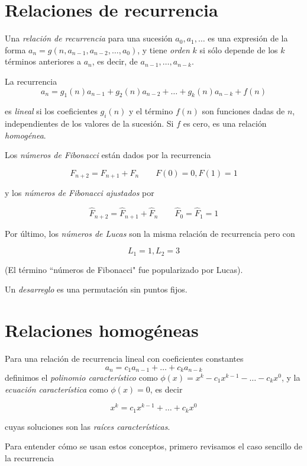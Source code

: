 \section{Relaciones de recurrencia}
\label{section-relaciones-de-recurrencia}
\begin{definition}
\label{definition-combi-002}
Una \emph{relación de recurrencia} para una
sucesión $a_0,a_1, \ldots$ es una expresión
de la forma $a_n = g(n,a_{n-1},a_{n-2},
\ldots,a_0)$, y tiene \emph{orden} $k$ si
sólo depende de los $k$ términos anteriores a
$a_n$, es decir, de $a_{n-1},
\ldots,a_{n-k}$.

La recurrencia
$$
a_n = g_{1}(n)a_{n-1} + g_{2}(n)a_{n-2} +
\ldots + g_k(n)a_{n-k} + f(n)
$$

es \emph{lineal} si los coeficientes $g_i(n)$
y el término $f(n)$ son funciones dadas de
$n$, independientes de los valores de la
sucesión. Si $f$ es cero, es una relación
\emph{homogénea}.
\end{definition}
\begin{definition}
\label{definition-combi-003}
Los \emph{números de Fibonacci} están dados
por la recurrencia

$$
F_{n+2}=F_{n+1}+F_n\qquad F(0)=0,F(1)=1
$$

y los \emph{números de Fibonacci ajustados}
por

$$
\hat{F}_{n + 2} = \hat{F}_{n + 1} + \hat{F}_n
\qquad \hat{F}_0 = \hat{F}_1 = 1
$$

Por último, los \emph{números de Lucas} son
la misma relación de recurrencia pero con

$$
L_1=1,L_2=3
$$

(El término ``números de Fibonacci" fue
popularizado por Lucas).

\end{definition}
\begin{definition}
\label{definition-combi-004}
Un \emph{desarreglo} es una permutación sin
puntos fijos.
\end{definition}
\section{Relaciones homogéneas}
\label{section-relaciones-homogeneas}
\begin{definition}
\label{definition-combi-005}
Para una relación de recurrencia lineal con
coeficientes constantes
\begin{equation}\label{ec-2.2.1}
a_n=c_1a_{n-1}+\ldots+c_ka_{n-k}
\end{equation}
definimos el \emph{polinomio característico}
como $\phi(x) = x^k-c_1x^{k-1}-
\ldots-c_kx^{0}$, y la \emph{ecuación
característica} como $\phi(x) = 0$, es decir

$$
x^k=c_1x^{k-1}+\ldots+c_kx^{0}
$$

cuyas soluciones son las \emph{raíces
características}.
\end{definition}
Para entender cómo se usan estos conceptos,
primero revisamos el caso sencillo de la
recurrencia

